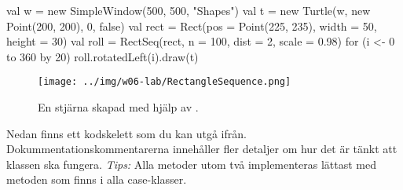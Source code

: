 \begin{Code}
val w = new SimpleWindow(500, 500, "Shapes")
val t = new Turtle(w, new Point(200, 200), 0, false)
val rect = Rect(pos = Point(225, 235), width = 50, height = 30)
val roll = RectSeq(rect, n = 100, dist = 2, scale = 0.98)
for (i <- 0 to 360 by 20) roll.rotatedLeft(i).draw(t)
\end{Code}


\begin{figure}
\centering
\texttt{[image: ../img/w06-lab/RectangleSequence.png]}
\caption {En stjärna skapad med hjälp av .}
\label{fig:classes:graphics:rectanglesequence}
\end{figure}

\noindent Nedan finns ett kodskelett som du kan utgå ifrån. Dokummentationskommentarerna innehåller fler detaljer om hur det är tänkt att klassen ska fungera. %
 \emph{Tips:} Alla metoder utom två implementeras lättast med metoden  som finns i alla case-klasser.

\begin{figure}[H]
\label{code:classes:graphics:rectanglesequence}
\end{figure}


